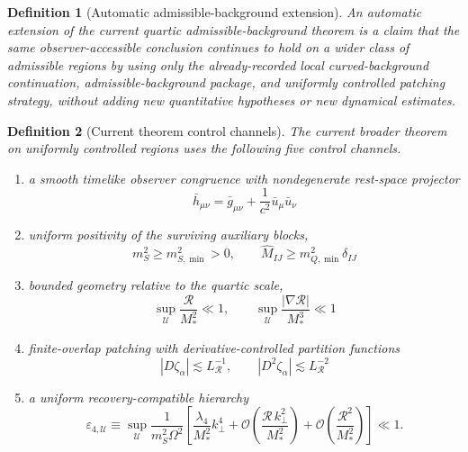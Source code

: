 \documentclass[11pt]{article}
\newtheorem{definition}{Definition}
\begin{document}
\begin{definition}[Automatic admissible-background extension]
An \emph{automatic extension} of the current quartic admissible-background theorem is a claim that the same observer-accessible conclusion continues to hold on a wider class of admissible regions by using only the already-recorded local curved-background continuation, admissible-background package, and uniformly controlled patching strategy, without adding new quantitative hypotheses or new dynamical estimates.
\end{definition}

\begin{definition}[Current theorem control channels]
The current broader theorem on uniformly controlled regions uses the following five control channels.
\begin{enumerate}
    \item a smooth timelike observer congruence with nondegenerate rest-space projector
    \begin{equation}
    \bar h_{\mu\nu}
    =
    \bar g_{\mu\nu}
    + \frac{1}{c^2}\bar u_\mu \bar u_\nu
    \label{eq:restprojector}
    \end{equation}
    \item uniform positivity of the surviving auxiliary blocks,
    \begin{equation}
    m_S^2\ge m_{S,\min}^2>0,
    \qquad
    \widehat M_{IJ}\ge m_{Q,\min}^2\delta_{IJ}
    \label{eq:positivity}
    \end{equation}
    \item bounded geometry relative to the quartic scale,
    \begin{equation}
    \sup_{\mathcal U}\frac{\mathcal R}{M_*^2}\ll 1,
    \qquad
    \sup_{\mathcal U}\frac{|\nabla\mathcal R|}{M_*^3}\ll 1
    \label{eq:geometry}
    \end{equation}
    \item finite-overlap patching with derivative-controlled partition functions
    \begin{equation}
    |D\zeta_\alpha|\lesssim L_{\mathcal R}^{-1},
    \qquad
    |D^2\zeta_\alpha|\lesssim L_{\mathcal R}^{-2}
    \label{eq:partition}
    \end{equation}
    \item a uniform recovery-compatible hierarchy
    \begin{equation}
    \varepsilon_{4,\mathcal U}
    \equiv
    \sup_{\mathcal U}
    \frac{1}{m_S^2\Omega^2}
    \left[
    \frac{\lambda_4}{M_*^2}k_\perp^4
    + \mathcal O\!\left(\frac{\mathcal R\,k_\perp^2}{M_*^2}\right)
    + \mathcal O\!\left(\frac{\mathcal R^2}{M_*^2}\right)
    \right]
    \ll 1.
    \label{eq:epsU}
    \end{equation}
\end{enumerate}
\end{definition}
\end{document}
